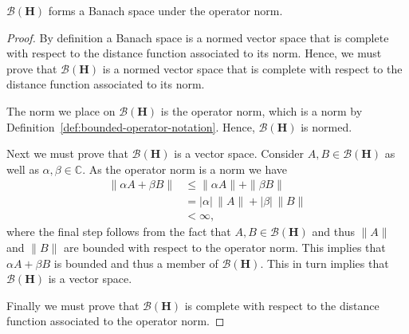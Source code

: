\begin{lemma}
    \label{lmm:bounded-operators-form-a-banach-space}
    \leanok
    $\mathcal{B}(\mathbf{H})$ forms a Banach space under the operator norm.
\end{lemma}
\begin{proof}
    \leanok
By definition a Banach space is a normed vector space that is complete with respect to the distance function associated to its norm. Hence, we must prove that $\mathcal{B}(\mathbf{H})$ is a normed vector space that is complete with respect to the distance function associated to its norm.

The norm we place on $\mathcal{B}(\mathbf{H})$ is the operator norm, which is a norm by Definition~\ref{def:bounded-operator-notation}. Hence, $\mathcal{B}(\mathbf{H})$ is normed.

Next we must prove that $\mathcal{B}(\mathbf{H})$ is a vector space. Consider $A, B \in \mathcal{B}(\mathbf{H})$ as well as $\alpha, \beta \in \mathbb{C}$. As the operator norm is a norm we have
\begin{align}
    \|\alpha A + \beta B\| &\le \|\alpha A\| + \|\beta B\| \\
                           &=    \lvert \alpha \rvert \, \|A\| + \lvert \beta \rvert \, \|B\| \\
                           &< \infty,
\end{align}
where the final step follows from the fact that $A, B \in \mathcal{B}(\mathbf{H})$ and thus $\|A\|$ and $\|B\|$ are bounded with respect to the operator norm. This implies that $\alpha A + \beta B$ is bounded and thus a member of $\mathcal{B}(\mathbf{H})$. This in turn implies that $\mathcal{B}(\mathbf{H})$ is a vector space.

Finally we must prove that $\mathcal{B}(\mathbf{H})$ is complete with respect to the distance function associated to the operator norm.


\end{proof}
